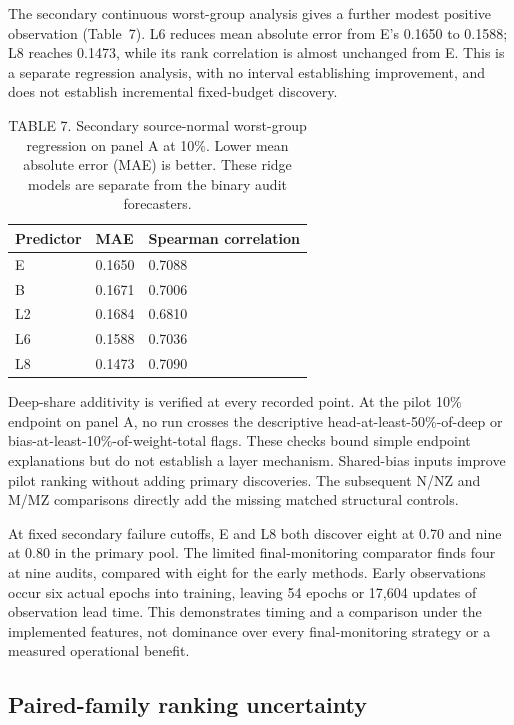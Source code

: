 The secondary continuous worst-group analysis gives a further modest positive observation (Table~7). L6 reduces mean absolute error from E's 0.1650 to 0.1588; L8 reaches 0.1473, while its rank correlation is almost unchanged from E. This is a separate regression analysis, with no interval establishing improvement, and does not establish incremental fixed-budget discovery.

\begin{table}[t]
\caption{TABLE 7. Secondary source-normal worst-group regression on panel A at 10\%. Lower mean absolute error (MAE) is better. These ridge models are separate from the binary audit forecasters.}
\label{tab:ridge}
\centering\small
\begin{tabular}{lll}
\toprule Predictor & MAE & Spearman correlation\\\midrule
E &0.1650&0.7088\\
B &0.1671&0.7006\\
L2&0.1684&0.6810\\
L6&0.1588&0.7036\\
L8&0.1473&0.7090\\\bottomrule
\end{tabular}
\end{table}

Deep-share additivity is verified at every recorded point. At the pilot 10\% endpoint on panel A, no run crosses the descriptive head-at-least-50\%-of-deep or bias-at-least-10\%-of-weight-total flags. These checks bound simple endpoint explanations but do not establish a layer mechanism. Shared-bias inputs improve pilot ranking without adding primary discoveries. The subsequent N/NZ and M/MZ comparisons directly add the missing matched structural controls.

At fixed secondary failure cutoffs, E and L8 both discover eight at 0.70 and nine at 0.80 in the primary pool. The limited final-monitoring comparator finds four at nine audits, compared with eight for the early methods. Early observations occur six actual epochs into training, leaving 54 epochs or 17,604 updates of observation lead time. This demonstrates timing and a comparison under the implemented features, not dominance over every final-monitoring strategy or a measured operational benefit.

\subsection{Paired-family ranking uncertainty}


